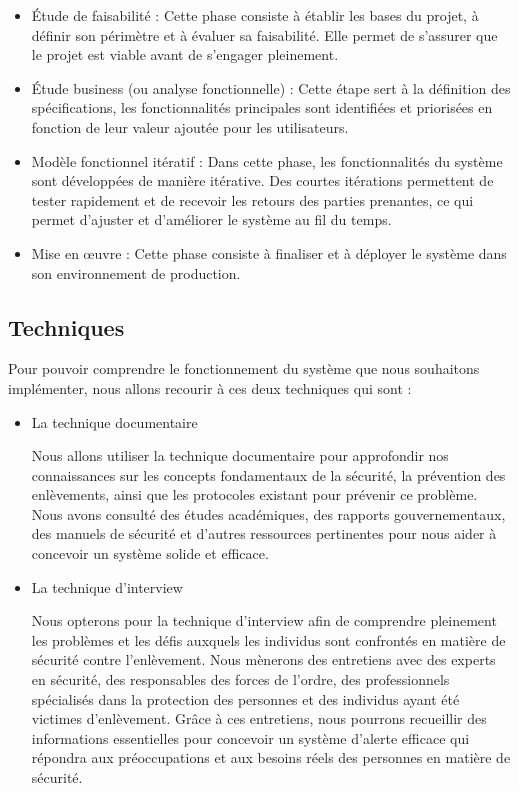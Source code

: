 \begin{itemize}
	\item Étude de faisabilité : Cette phase consiste à établir les bases du projet, à définir son périmètre et à évaluer sa faisabilité. Elle permet de s'assurer que le projet est viable avant de s'engager pleinement.
	
	\item Étude business (ou analyse fonctionnelle) : Cette étape sert à la définition des spécifications, les fonctionnalités principales sont identifiées et priorisées en fonction de leur valeur ajoutée pour les utilisateurs.
	\item Modèle fonctionnel itératif : Dans cette phase, les fonctionnalités du système sont développées de manière itérative. Des courtes itérations permettent de tester rapidement et de recevoir les retours des parties prenantes, ce qui permet d'ajuster et d'améliorer le système au fil du temps.
	
	\item Mise en œuvre : Cette phase consiste à finaliser et à déployer le système dans son environnement de production.
\end{itemize}

\subsection{Techniques}
Pour pouvoir comprendre le fonctionnement du système que nous souhaitons implémenter, nous allons recourir à ces deux techniques qui sont :

\begin{itemize}
	\item La technique documentaire
	
	Nous allons utiliser la technique documentaire pour approfondir nos connaissances sur les concepts fondamentaux de la sécurité, la prévention des enlèvements, ainsi que les protocoles existant pour prévenir ce problème. Nous avons consulté des études académiques, des rapports gouvernementaux, des manuels de sécurité et d'autres ressources pertinentes pour nous aider à concevoir un système solide et efficace.
	
	\item La technique d’interview
	
	Nous opterons pour la technique d'interview afin de comprendre pleinement les problèmes et les défis auxquels les individus sont confrontés en matière de sécurité contre l'enlèvement.  Nous mènerons des entretiens avec des experts en sécurité, des responsables des forces de l'ordre, des professionnels spécialisés dans la protection des personnes et des individus ayant été victimes d'enlèvement. Grâce à ces entretiens, nous pourrons recueillir des informations essentielles pour concevoir un système d'alerte efficace qui répondra aux préoccupations et aux besoins réels des personnes en matière de sécurité.
\end{itemize}

